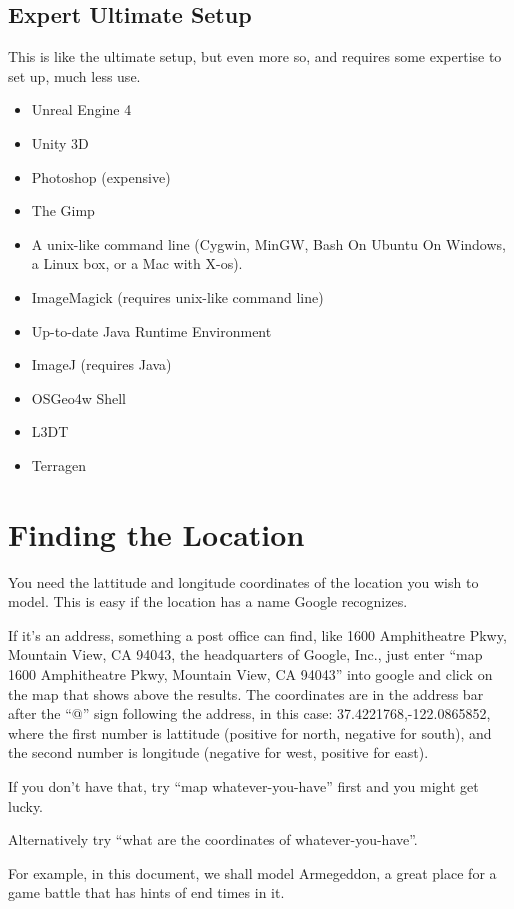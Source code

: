 \documentclass[letter,12pt]{article}
\begin{document}
\subsection{Expert Ultimate Setup}

This is like the ultimate setup,  but even more so, and requires some expertise to set up, much less use.

\begin{itemize}
\item Unreal Engine 4
\item Unity 3D
\item Photoshop (expensive)
\item The Gimp
\item A unix-like command line (Cygwin, MinGW, Bash On Ubuntu On Windows, a Linux box, or a Mac with X-os).
\item ImageMagick (requires unix-like command line)
\item Up-to-date Java Runtime Environment
\item ImageJ (requires Java)
\item OSGeo4w Shell
\item L3DT 
\item Terragen
\end{itemize}


\section{Finding the Location}

You need the lattitude and longitude coordinates of the location you wish to model.  This is easy if the location has a name Google recognizes.  

If it’s an address, something a post office can find, like  1600 Amphitheatre Pkwy, Mountain View, CA 94043, the headquarters of Google, Inc., just enter “map  1600 Amphitheatre Pkwy, Mountain View, CA 94043” into google and click on the map that shows above the results.  The coordinates are in the address bar after the “@” sign following the address, in this case: 37.4221768,-122.0865852, where the first number is lattitude (positive for north, negative for south), and the second number is longitude (negative for west, positive for east).

If you don’t have that, try “map whatever-you-have” first and you might get lucky.  

Alternatively try “what are the coordinates of whatever-you-have”. 

For example, in this document, we shall model Armegeddon, a great place for a game battle that has hints of end times in it.
\end{document}
